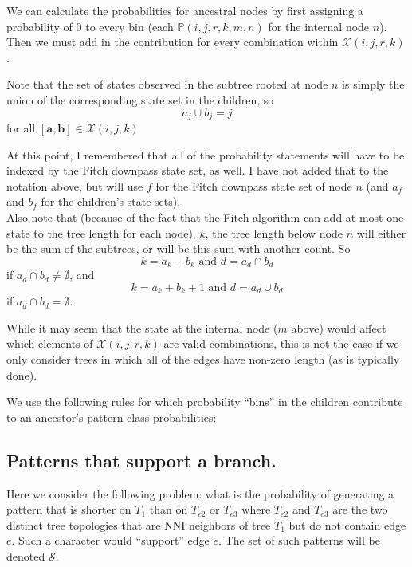 \documentclass[11pt]{article}
\newcommand{\comboSet}{\ensuremath{\mathcal X}\xspace}
\newcommand{\patProbSym}{\ensuremath{\mathbb P}\xspace}
\newcommand{\patProb}[6]{\ensuremath{\patProbSym\left(#1,#2,#3,#4,#5,#6\right)}\xspace}
\newcommand{\mthNote}[1]{{\color{red}#1}\\}
\begin{document}
We can calculate the probabilities for ancestral nodes by first assigning a probability of 0 to every bin (each \patProb{i}{j}{r}{k}{m}{n} for the internal node $n$).
Then we must add in the contribution for every combination within $\comboSet(i, j, r, k)$.

Note that the set of states observed in the subtree rooted at node $n$ is simply the union of the corresponding state set in the children, so
$$	a_j \cup b_j = j $$
for all $[{\bm a}, {\bm b}]\in\comboSet(i, j, k)$


\mthNote{At this point, I remembered that all of the probability statements will have to be indexed by the Fitch downpass state set, as well.  I have not added that to the notation above, but will use $f$ for the Fitch downpass state set of node $n$ (and $a_f$ and $b_f$ for the children's state sets).}
Also note that (because of the fact that the Fitch algorithm can add at most one state to the tree length for each node), $k$, the tree length below node $n$ will either be the sum of the subtrees, or will be this sum with another count.
So
 $$k = a_k + b_k\mbox{ and } d = a_d \cap b_d$$
 if $a_d \cap b_d \neq \emptyset$, and
  $$k = a_k + b_k + 1\mbox{ and } d = a_d \cup b_d$$
 if $a_d \cap b_d = \emptyset$.

While it may seem that the state at the internal node ($m$ above) would affect which elements of $\comboSet(i, j, r, k)$ are valid combinations, this is not the case if we only consider trees in which all of the edges have non-zero length (as is typically done).



We use the following rules for which probability ``bins'' in the children contribute to an ancestor's pattern class probabilities:













\subsection{Patterns that support a branch.}
Here we consider the following problem: what is the probability of generating a pattern that is shorter on $T_1$ than on $T_{e2}$ or $T_{e3}$ where $T_{e2}$ and $T_{e3}$ are the two distinct tree topologies that are NNI neighbors of tree $T_1$ but do not contain edge $e$.
Such a character would ``support'' edge $e$.
The set of such patterns will be denoted $\mathcal{S}$.
\end{document}
